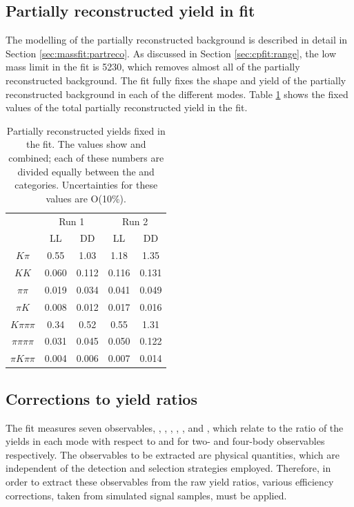 \subsection{Partially reconstructed yield in \CP fit}
\label{sec:cpfit:partrecoyields}

The modelling of the partially reconstructed background is described in detail in Section \ref{sec:massfit:partreco}. As discussed in Section \ref{sec:cpfit:range}, the low mass limit in the \CP fit is 5230\mevcc, which removes almost all of the partially reconstructed background. The \CP fit fully fixes the shape and yield of the partially reconstructed background in each of the different \Dz modes. Table \ref{partrecofixedyields} shows the fixed values of the total partially reconstructed yield in the \CP fit.

\begin{table}[h]
\centering
\begin{tabular}{c|cc|cc}
\hline
& \multicolumn{2}{c}{Run 1} & \multicolumn{2}{c}{Run 2} \\
& LL & DD & LL & DD \\
\hline
$K\pi$ & 0.55 & 1.03 & 1.18 & 1.35 \\
$KK$ & 0.060 & 0.112 & 0.116 & 0.131 \\
$\pi\pi$ & 0.019 & 0.034 & 0.041 & 0.049 \\
$\pi K$ & 0.008 & 0.012 & 0.017 & 0.016 \\
$K\pi\pi\pi$ & 0.34 & 0.52 & 0.55 & 1.31 \\
$\pi\pi\pi\pi$ & 0.031 & 0.045 & 0.050 & 0.122  \\
$\pi K\pi\pi$ & 0.004 & 0.006 & 0.007 & 0.014 \\
\hline
\end{tabular}
\caption{Partially reconstructed yields fixed in the \CP fit. The values show \Bp and \Bm combined; each of these numbers are divided equally between the \Bp and \Bm categories. Uncertainties for these values are O(10\%).}
\label{partrecofixedyields}
\end{table}

\subsection{Corrections to yield ratios}
\label{sec:cpfit:efficiencies}

The \CP fit measures seven observables, \Rkk, \Rpipi, \Rptwo, \Rmtwo, \Rpipipipi, \Rpfour and \Rmfour, which relate to the ratio of the yields in each \Dz mode with respect to \decay{\Bm}{\D(\Km\pip)\Kstarm} and \decay{\Bm}{\D(\Km\pip\pim\pip)\Kstarm} for two- and four-body observables respectively. The \CP observables to be extracted are physical quantities, which are independent of the detection and selection strategies employed. Therefore, in order to extract these \CP observables from the raw yield ratios, various efficiency corrections, taken from simulated signal samples, must be applied.

